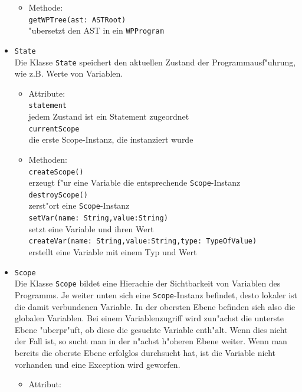 \documentclass[10pt,a4paper,titlepage]{article}
\begin{document}
\begin{itemize}
\begin{itemize}
\item Methode: \\
\texttt{getWPTree(ast: ASTRoot)} \\
"ubersetzt den AST in ein \texttt{WPProgram}
\end{itemize}
\item \texttt{State} \\
Die Klasse \texttt{State} speichert den aktuellen Zustand der Programmausf"uhrung, wie z.B. Werte von Variablen.
\begin{itemize}
\item Attribute: \\
\texttt{statement} \\
jedem Zustand ist ein Statement zugeordnet \\
\texttt{currentScope} \\
die erste Scope-Instanz, die instanziert wurde
\item Methoden: \\
\texttt{createScope()} \\
erzeugt f"ur eine Variable die entsprechende \texttt{Scope}-Instanz \\
\texttt{destroyScope()} \\
zerst"ort eine \texttt{Scope}-Instanz \\
\texttt{setVar(name: String,value:String)}  \\
setzt eine Variable und ihren Wert \\
\texttt{createVar(name: String,value:String,type: TypeOfValue)} \\
erstellt eine Variable mit einem Typ und Wert
\end{itemize}
\item \texttt{Scope} \\
Die Klasse \texttt{Scope} bildet eine Hierachie der Sichtbarkeit von Variablen des Programms. Je weiter unten sich eine \texttt{Scope}-Instanz befindet, desto lokaler ist die damit verbundenen Variable. In der obersten Ebene befinden sich also die globalen Variablen. Bei einem Variablenzugriff wird zun"achst die unterste Ebene "uberpr"uft, ob diese die gesuchte Variable enth"alt. Wenn dies nicht der Fall ist, so sucht man in der n"achst h"oheren Ebene weiter. Wenn man bereits die oberste Ebene erfolglos durchsucht hat, ist die Variable nicht vorhanden und eine Exception wird geworfen. 
\begin{itemize}
\item Attribut: \\

\end{itemize}
\end{itemize}
\end{document}
